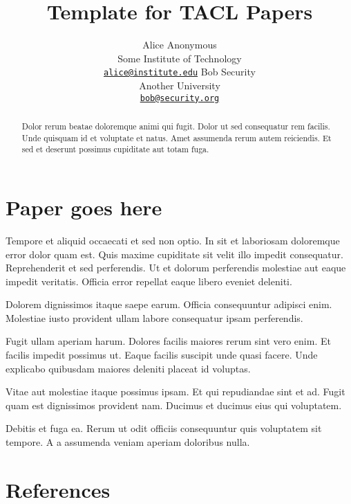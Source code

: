 \documentclass[11pt,a4paper]{article}
\title{Template for TACL Papers}
\author{
    Alice Anonymous \\ Some Institute of Technology \\ {\sf \href{mailto:alice@institute.edu}{\nolinkurl{alice@institute.edu}}} \And
    Bob Security \\ Another University \\ {\sf \href{mailto:bob@security.org}{\nolinkurl{bob@security.org}}} }
\date{}
\begin{document}
\maketitle
\begin{abstract}
Dolor rerum beatae doloremque animi qui fugit. Dolor ut sed consequatur
rem facilis. Unde quisquam id et voluptate et natus. Amet assumenda
rerum autem reiciendis. Et sed et deserunt possimus cupiditate aut totam
fuga.
\end{abstract}

\section{Paper goes here}\label{paper-goes-here}

Tempore et aliquid occaecati et sed non optio. In sit et laboriosam
doloremque error dolor quam est. Quis maxime cupiditate sit velit illo
impedit consequatur. Reprehenderit et sed perferendis. Ut et dolorum
perferendis molestiae aut eaque impedit veritatis. Officia error
repellat eaque libero eveniet deleniti.

Dolorem dignissimos itaque saepe earum. Officia consequuntur adipisci
enim. Molestiae iusto provident ullam labore consequatur ipsam
perferendis.

Fugit ullam aperiam harum. Dolores facilis maiores rerum sint vero enim.
Et facilis impedit possimus ut. Eaque facilis suscipit unde quasi
facere. Unde explicabo quibusdam maiores deleniti placeat id voluptas.

Vitae aut molestiae itaque possimus ipsam. Et qui repudiandae sint et
ad. Fugit quam est dignissimos provident nam. Ducimus et ducimus eius
qui voluptatem.

Debitis et fuga ea. Rerum ut odit officiis consequuntur quis voluptatem
sit tempore. A a assumenda veniam aperiam doloribus nulla.

\section{References}\label{references}



\end{document}
